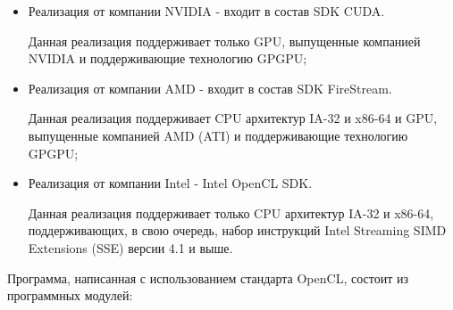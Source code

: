 \begin{itemize}

	\item Реализация от компании NVIDIA - входит в состав SDK CUDA.

		Данная реализация поддерживает только GPU, выпущенные компанией NVIDIA и поддерживающие технологию GPGPU;

	\item Реализация от компании AMD - входит в состав SDK FireStream.

		Данная реализация поддерживает CPU архитектур IA-32 и x86-64 и GPU, выпущенные компанией AMD (ATI) и поддерживающие технологию GPGPU;

	\item Реализация от компании Intel - Intel OpenCL SDK.

		Данная реализация поддерживает только CPU архитектур IA-32 и x86-64, поддерживающих, в свою очередь, набор инструкций Intel Streaming SIMD Extensions (SSE) версии 4.1 и выше.

\end{itemize}

Программа, написанная с использованием стандарта OpenCL, состоит из программных модулей:

